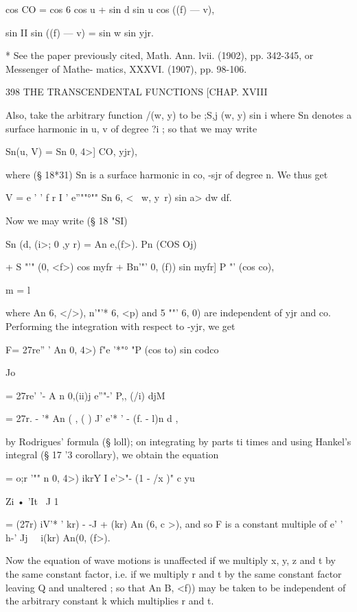 cos CO = cos 6 cos u + sin d sin u cos ((f) — v), 

sin II sin ((f) — v) = sin w sin yjr. 

* See the paper previously cited, Math. Ann. lvii. (1902), pp. 342-345, or Messenger of Mathe- 
matics, XXXVI. (1907), pp. 98-106. 



398 THE TRANSCENDENTAL FUNCTIONS [CHAP. XVIII 

Also, take the arbitrary function /(w, y) to be ;S,j (w, y) sin i  where Sn 
denotes a surface harmonic in u, v of degree ?i ; so that we may write 

Sn(u, V) = Sn  0, 4>] CO, yjr), 

where (§ 18*31) Sn is a surface harmonic in co, -sjr of degree n.   
We thus get 

V = e ' ' f r I ' e''""°"" Sn  6, < \ w, y\ r) sin a> dw df. 

Now we may write (§ 18 "SI) 

Sn (d, (i>; 0 ,y r) = An e,(f>). Pn (COS Oj) 

+ S    "'" (0, <f>) cos myfr + Bn'"'   0, (f)) sin myfr] P "' (cos co), 

m = l 

where An  6, </>),  n'"'*  6, <p) and 5 ""'  6, 0) are independent of yjr and co. 
Performing the integration with respect to -yjr, we get 

F= 27re'' '   An  0, 4>) f"e '*"° "P  (cos to) sin codco 

Jo 

= 27re' '-  A n  0,(ii)j e''"-'  P,, (/i) djM 

= 27r. - '* An (  , ( ) J'  e'* '  -  (f.  - l)n d , 

by Rodrigues' formula (§ loll); on integrating by parts ti times and using 
Hankel's integral (§ 17 '3 corollary), we obtain the equation 

 = o;r '"" n  0, 4>)  ikrY I e'>"-  (1 - /x )" c yu 

Zi • 'It \ J 1 

= (27r)  iV'* '   kr) - -J  +   (kr) An (6, c >), 
and so F is a constant multiple of e' ' h-'   Jj \  \ i(kr) An(0, (f>). 

Now the equation of wave motions is unaffected if we multiply x, y, z 
and t by the same constant factor, i.e. if we multiply r and t by the same 
constant factor leaving Q and   unaltered ; so that An B, <f)) may be taken 
to be independent of the arbitrary constant k which multiplies r and t. 

